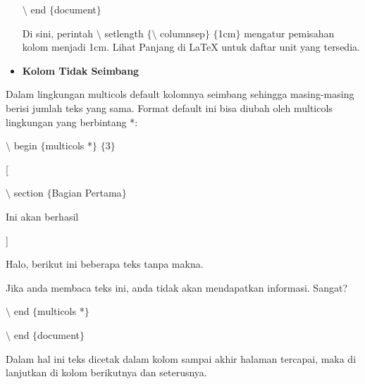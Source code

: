 \begin{itemize}
\hspace*{0.5in}$\setminus$ end $ \{ $document$ \} $\par

Di sini, perintah $\setminus$ setlength $ \{ $$\setminus$ columnsep$ \} $ $ \{ $1cm$ \} $ mengatur pemisahan kolom menjadi 1cm. Lihat Panjang di LaTeX untuk daftar unit yang tersedia.\par

\vspace{10pt}
	\item {\fontsize{14pt}{14pt}\selectfont \textbf{Kolom Tidak Seimbang}}
\end{itemize}\par


\noindent Dalam lingkungan multicols default kolomnya seimbang sehingga masing-masing berisi jumlah teks yang sama. Format default ini bisa diubah oleh multicols lingkungan yang berbintang *:\par


\noindent \hspace*{0.5in}$\setminus$ begin $ \{ $multicols *$ \} $ $ \{ $3$ \} $\par


\noindent \hspace*{0.5in}[\par


\noindent \hspace*{0.5in}\hspace*{0.5in}$\setminus$ section $ \{ $Bagian Pertama$ \} $\par


\noindent \hspace*{0.5in}\hspace*{0.5in}Ini akan berhasil\par


\noindent \hspace*{0.5in}]\par


\noindent \hspace*{0.5in}\hspace*{0.5in}Halo, berikut ini beberapa teks tanpa makna. \par


\noindent \hspace*{0.5in}\hspace*{0.5in}Jika anda membaca teks ini, anda tidak akan mendapatkan informasi. Sangat? \par


\noindent \hspace*{0.5in}$\setminus$ end $ \{ $multicols *$ \} $\par


\noindent \hspace*{0.5in}$\setminus$ end $ \{ $document$ \} $\par


\noindent Dalam hal ini teks dicetak dalam kolom sampai akhir halaman tercapai, maka di lanjutkan di kolom berikutnya dan seterusnya.\par
